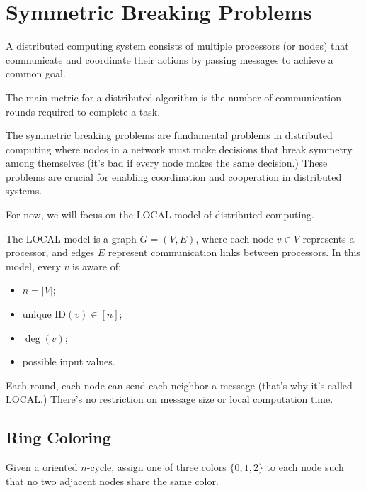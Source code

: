 \chapter{Symmetric Breaking Problems}

\begin{definition}
  A distributed computing system consists of multiple processors (or nodes) that communicate and coordinate their actions by passing messages to achieve a common goal.

  The main metric for a distributed algorithm is the number of communication rounds required to complete a task.
\end{definition}

The symmetric breaking problems are fundamental problems in distributed computing where nodes in a network must make decisions that break symmetry among themselves (it's bad if every node makes the same decision.) These problems are crucial for enabling coordination and cooperation in distributed systems.

For now, we will focus on the LOCAL model of distributed computing.

\begin{definition}
  The LOCAL model is a graph $G=(V,E)$, where each node $v \in V$ represents a processor, and edges $E$ represent communication links between processors. In this model, every $v$ is aware of:
  \begin{itemize}
    \item $n = |V|$;
    \item unique $\text{ID}(v) \in [n]$;
    \item $\deg(v)$;
    \item possible input values.
    \end{itemize}
    Each round, each node can send each neighbor a message (that's why it's called LOCAL.) There's no restriction on message size or local computation time.
\end{definition}

\section{Ring Coloring} \label{sec:ring-coloring}

\begin{question}
  Given a oriented $n$-cycle, assign one of three colors $\{0,1,2\}$ to each node such that no two adjacent nodes share the same color.
\end{question}

